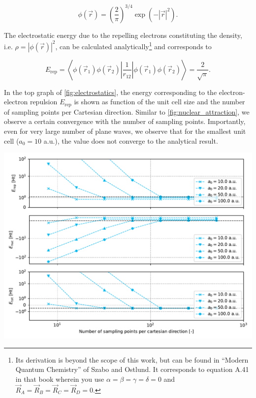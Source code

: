 \begin{equation}
    \phi(\vec{r}) = \left(\frac{2}{\pi} \right)^{3/4} \exp \left(-|\vec{r}|^{2} \right).
\end{equation}

The electrostatic energy due to the repelling electrons constituting the density, i.e. $\rho = |\phi(\vec{r})|^{2}$, can be calculated analytically\footnote{Its derivation is beyond the scope of this work, but can be found in ``Modern Quantum Chemistry'' of Szabo and Ostlund.\cite{szabo} It corresponds to equation A.41 in that book wherein you use $\alpha=\beta=\gamma=\delta=0$ and $\vec{R}_{A}=\vec{R}_{B}=\vec{R}_{C}=\vec{R}_{D}=0$.} and corresponds to

\begin{equation}
    E_{\text{rep}} = \left<\phi(\vec{r}_{1})\phi(\vec{r}_{2})\left|\frac{1}{r_{12}}\right|\phi(\vec{r}_{1})\phi(\vec{r}_{2})\right> = \frac{2}{\sqrt{\pi}}.
\end{equation}

In the top graph of \cref{fig:electrostatics}, the energy corresponding to the electron-electron repulsion $E_{\text{rep}}$ is shown as function of the unit cell size and the number of sampling points per Cartesian direction. Similar to \cref{fig:nuclear_attraction}, we observe a certain convergence with the number of sampling points. Importantly, even for very large number of plane waves, we observe that for the smallest unit cell ($a_{0} = 10$ a.u.), the value does not converge to the analytical result.

\begin{Figure}
    \centering
    \includegraphics[width=\linewidth]{img/fig6_electrostatics.pdf}
    \label{fig:electrostatics}
\end{Figure}

